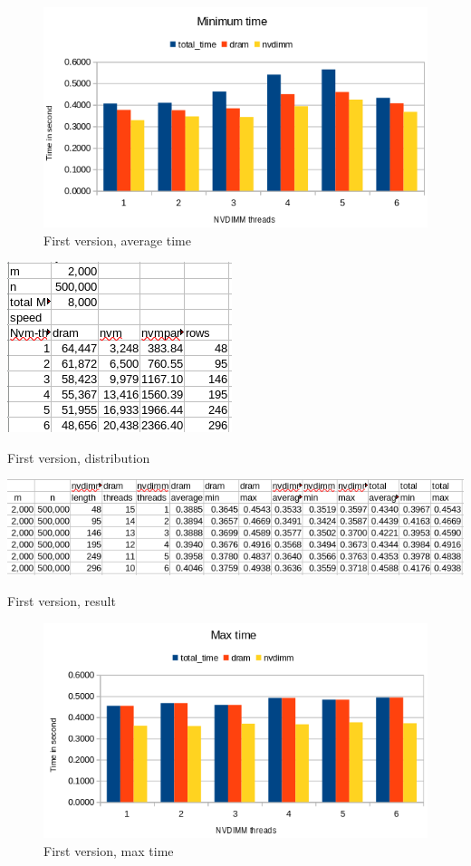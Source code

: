 \documentclass[12pt,a4paper,USenglish]{article}      %
\begin{document}
\begin{figure}[!hbtp]
\includegraphics[scale=0.7]{Large_Array_test/First_version_1k_1000k_MinTime.png}
\caption{First version, average time}
\end{figure}

\begin{table}[!hbtp]
\includegraphics[scale=0.6]{Large_Array_test/Large_Array_test_fordeling.png}
\caption{First version, distribution}
\end{table}

\begin{table}[!hbtp]
\includegraphics[scale=0.6]{Large_Array_test/First_version_v3_table.png}
\caption{First version, result}
\end{table}

\begin{figure}[!hbtp]
\includegraphics[scale=0.7]{Large_Array_test/First_version_v3_figur_1.png}
\caption{First version, max time}
\end{figure}
\end{document}
